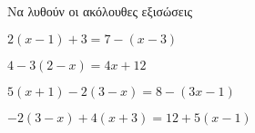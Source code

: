 Να λυθούν οι ακόλουθες εξισώσεις
\begin{alist}
\item $ 2(x-1)+3=7-(x-3) $
\item $ 4-3(2-x)=4x+12 $
\item $ 5(x+1)-2(3-x)=8-(3x-1) $
\item $ -2(3-x)+4(x+3)=12+5(x-1) $
\end{alist}
